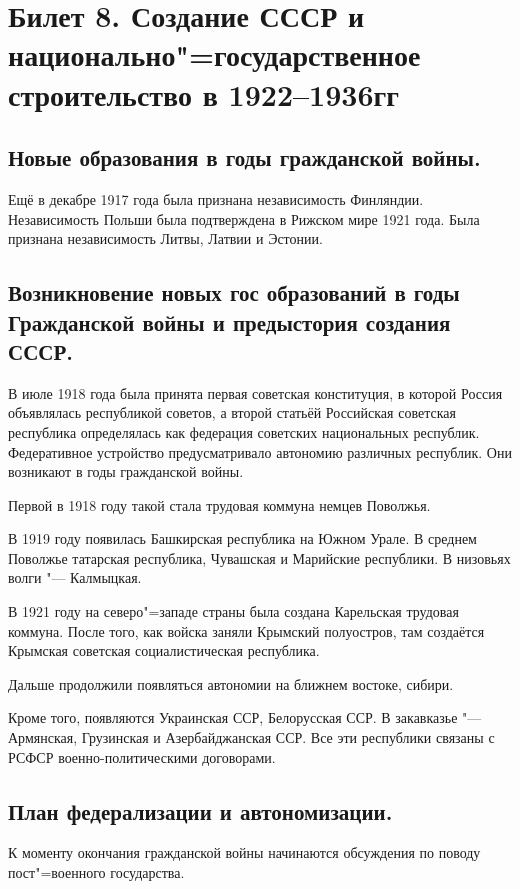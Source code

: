 \section{Билет 8. Создание СССР и национально"=государственное строительство в 1922--1936гг}

\subsection{Новые образования в годы гражданской войны.}

Ещё в декабре 1917 года была признана независимость Финляндии. Независимость Польши была подтверждена в Рижском мире 1921 года. Была признана независимость Литвы, Латвии и Эстонии.

\subsection{Возникновение новых гос образований в годы Гражданской войны и предыстория создания СССР.}

В июле 1918 года была принята первая советская конституция, в которой Россия объявлялась республикой советов, а второй статьёй Российская советская республика определялась как федерация советских национальных республик. Федеративное устройство предусматривало автономию различных республик. Они возникают в годы гражданской войны.

Первой в 1918 году такой стала трудовая коммуна немцев Поволжья.

В 1919 году появилась Башкирская республика на Южном Урале. В среднем Поволжье татарская республика, Чувашская и Марийские республики. В низовьях волги "--- Калмыцкая.

В 1921 году на северо"=западе страны была создана Карельская трудовая коммуна. После того, как войска заняли Крымский полуостров, там создаётся Крымская советская социалистическая республика. 

Дальше продолжили появляться автономии на ближнем востоке, сибири.

Кроме того, появляются Украинская ССР, Белорусская ССР. В закавказье "--- Армянская, Грузинская и Азербайджанская ССР. Все эти республики связаны с РСФСР военно-политическими договорами.

\subsection{План федерализации и автономизации.}

К моменту окончания гражданской войны начинаются обсуждения по поводу пост"=военного государства. 

